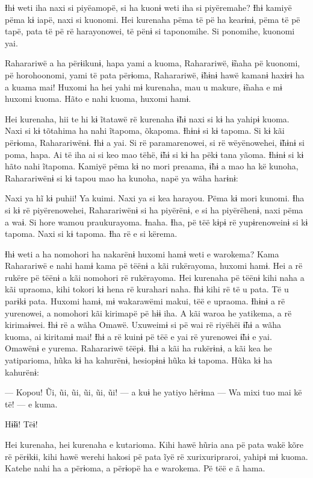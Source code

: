 Ɨhɨ weti iha naxi si piyëamopë, si ha kuonɨ weti iha si piyëremahe? Ɨhɨ
kamiyë pëma kɨ iapë, naxi si kuonomi. Hei kurenaha pëma të pë ha
kearɨnɨ, pëma të pë tapë, pata të pë rë harayonowei, të pënɨ si
taponomihe. Si ponomihe, kuonomi yai. 

Raharariwë a ha përɨikunɨ, hapa yami a kuoma, Raharariwë, ɨ̃naha pë
kuonomi, pë horohoonomi, yami të pata përɨoma, Raharariwë, ɨ̃hɨnɨ hawë
kamanɨ haxɨrɨ ha a kuama mai! Huxomi ha hei yahi mɨ kurenaha, mau u
makure, ɨ̃naha e mɨ huxomi kuoma. Hãto e nahi kuoma, huxomi hamɨ. 

Hei kurenaha, hii te hi kɨ ĩtatawë rë kurenaha ɨ̃hɨ naxi si kɨ ha yahipɨ
kuoma. Naxi si kɨ tõtahima ha nahi ĩtapoma, õkapoma. Ɨhɨnɨ si kɨ tapoma.
Si kɨ kãi përɨoma, Raharariwënɨ. Ɨhɨ a yai. Si rë paramarenowei, si rë
wëyënowehei, ɨ̃hɨnɨ si poma, hapa. Ai të iha ai si keo mao tëhë, ɨ̃hɨ si
kɨ ha pëkɨ tana yãoma. Ɨhɨnɨ si kɨ hãto nahi ĩtapoma. Kamiyë pëma kɨ no
mori preaama, ɨ̃hɨ a mao ha kë kunoha, Raharariwënɨ si kɨ tapou mao ha
kunoha, napë ya wãha harɨnɨ: 

Naxi ya hĩ kɨ puhii! Ya kuimi. Naxi ya si kea harayou. Pëma kɨ mori
kunomi. Ɨha si kɨ rë piyërenowehei, Raharariwënɨ si ha piyërënɨ, e si ha
piyërëhenɨ, naxi pëma a waɨ. Si hore wamou praukurayoma. Ɨnaha. Ɨha, pë
tëë kɨpɨ rë yupɨrenoweinɨ si kɨ tapoma. Naxi si kɨ tapoma. Ɨha rë e si
kërema. 

Ɨhɨ weti a ha nomohori ha nakarënɨ huxomi hamɨ weti e warokema? Kama
Raharariwë e nahi hamɨ kama pë tëënɨ a kãi rukërayoma, huxomi hamɨ. Hei
a rë rukëre pë tëënɨ a kãi nomohori rë rukërayoma. Hei kurenaha pë tëënɨ
kihi naha a kãi upraoma, kihi tokori kɨ hena rë kurahari naha. Ɨhɨ kihi
rë të u pata. Të u parɨkɨ pata. Huxomi hamɨ, mɨ wakarawëmi makui, tëë e
upraoma. Ɨhɨnɨ a rë yurenowei, a nomohori kãi kirimapë pë hɨɨ iha. A kãi
waroa he yatikema, a rë kirimaɨwei. Ɨhɨ rë a wãha Omawë. Uxuweimɨ si pë
wai rë riyëhëi ɨ̃hɨ a wãha kuoma, ai kiritamɨ mai! Ɨhɨ a rë kuinɨ pë tëë
e yai rë yurenowei ɨ̃hɨ e yai. Omawënɨ e yurema. Raharariwë tëëpɨ. Ɨhɨ a
kãi ha rukërɨnɨ, a kãi kea he yatiparioma, hũka kɨ ha kahurënɨ,
hesiopɨnɨ hũka kɨ tapoma. Hũka kɨ ha kahurënɨ: 

--- Kopou! Ũi, ũi, ũi, ũi, ũi, ũi! --- a kuɨ he yatiyo hërɨma --- Wa mixi
tuo mai kë të! --- e kuma. 

Hɨ̃ɨɨ! Tëɨ! 

Hei kurenaha, hei kurenaha e kutarioma. Kihi hawë hũria ana pë pata wakë
kõre rë përɨkɨi, kihi hawë werehi hakosi pë pata ĩyë rë xurixuripraroi,
yahipɨ mɨ kuoma. Katehe nahi ha a përɨoma, a përɨopë ha e warokema. Pë
tëë e ã hama. 

